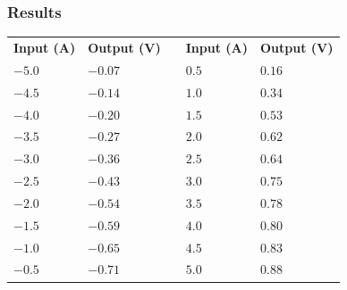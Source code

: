 \subsubsection{Results}

\begin{table}[H]
\begin{tabular}{|l|l|l| l|l|}
\cline{1-2}\cline{4-5}%
  \textbf{Input (A)}   & \textbf{Output (V)} &\phantom{hey}& \textbf{Input (A)}   & \textbf{Output (V)}\\
\cline{1-2}\cline{4-5}%
  $-5.0$               &            $-0.07$  && $0.5$                & $0.16$             \\
\cline{1-2}\cline{4-5}%
  $-4.5$               &            $-0.14$  && $1.0$                & $0.34$             \\
\cline{1-2}\cline{4-5}%
  $-4.0$               &            $-0.20$  && $1.5$                & $0.53$             \\
\cline{1-2}\cline{4-5}%
  $-3.5$               &            $-0.27$  && $2.0$                & $0.62$             \\
\cline{1-2}\cline{4-5}%
  $-3.0$               &            $-0.36$  && $2.5$                & $0.64$             \\
\cline{1-2}\cline{4-5}%
  $-2.5$               &            $-0.43$  && $3.0$                & $0.75$             \\
\cline{1-2}\cline{4-5}%
  $-2.0$               &            $-0.54$  && $3.5$                & $0.78$             \\
\cline{1-2}\cline{4-5}%
  $-1.5$               &            $-0.59$  && $4.0$                & $0.80$             \\
\cline{1-2}\cline{4-5}%
  $-1.0$               &            $-0.65$  && $4.5$                & $0.83$             \\
\cline{1-2}\cline{4-5}%
  $-0.5$               &            $-0.71$  && $5.0$                & $0.88$             \\
\cline{1-2}\cline{4-5}%
\end{tabular}
\end{table}

